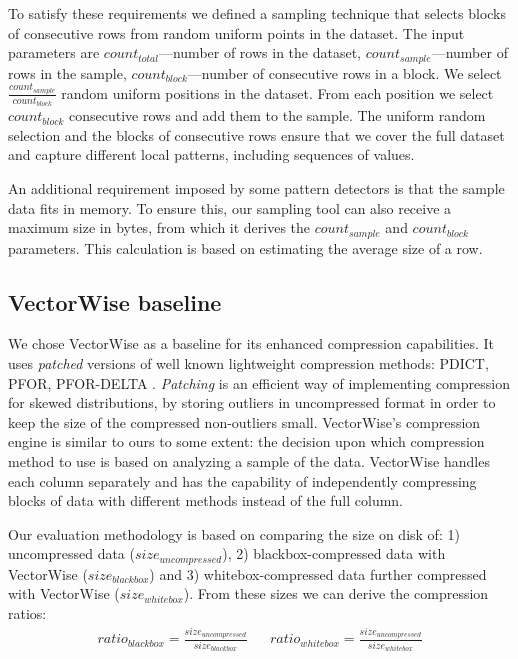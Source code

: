 To satisfy these requirements we defined a sampling technique that selects blocks of consecutive rows from random uniform points in the dataset. The input parameters are \(count_{total}\)---number of rows in the dataset, \(count_{sample}\)---number of rows in the sample, \(count_{block}\)---number of consecutive rows in a block. We select \(\frac{count_{sample}}{count_{block}}\) random uniform positions in the dataset. From each position we select \(count_{block}\) consecutive rows and add them to the sample. The uniform random selection and the blocks of consecutive rows ensure that we cover the full dataset and capture different local patterns, including sequences of values.

An additional requirement imposed by some pattern detectors is that the sample data fits in memory. To ensure this, our sampling tool can also receive a maximum size in bytes, from which it derives the \(count_{sample}\) and \(count_{block}\) parameters. This calculation is based on estimating the average size of a row.




\subsection{VectorWise baseline}
\label{subsec:eval:methodology:vectorwise}

We chose VectorWise as a baseline for its enhanced compression capabilities. It uses \textit{patched} versions of well known lightweight compression methods: PDICT, PFOR, PFOR-DELTA \cite{zukowski2006super}. \textit{Patching} is an efficient way of implementing compression for skewed distributions, by storing outliers in uncompressed format in order to keep the size of the compressed non-outliers small. VectorWise's compression engine is similar to ours to some extent: the decision upon which compression method to use is based on analyzing a sample of the data. VectorWise handles each column separately and has the capability of independently compressing blocks of data with different methods instead of the full column.


Our evaluation methodology is based on comparing the size on disk of: 1) uncompressed data (\(size_{uncompressed}\)), 2) blackbox-compressed data with VectorWise (\(size_{blackbox}\)) and 3) whitebox-compressed data further compressed with VectorWise (\(size_{whitebox}\)). From these sizes we can derive the compression ratios:
\begin{align}
\label{eq:eval:vectorwise:ratios}
    \mathit{ratio_{blackbox}} = \frac{size_{uncompressed}}{size_{blackbox}} && 
    \mathit{ratio_{whitebox}} = \frac{size_{uncompressed}}{size_{whitebox}}
\end{align}


